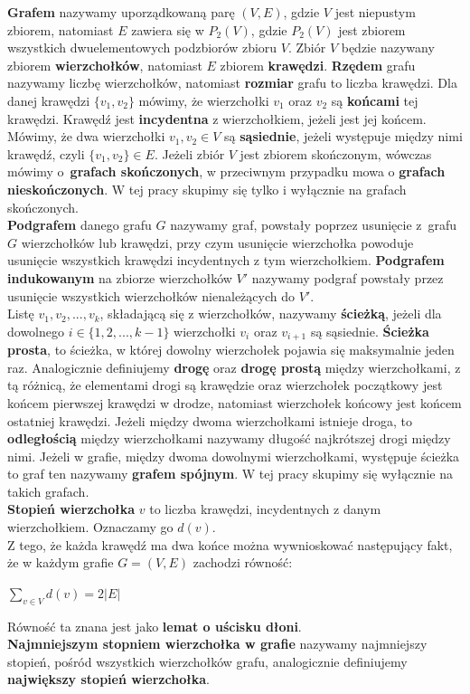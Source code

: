 \documentclass[12pt,a4paper,titlepage]{article}
\newcommand\tab[1][1cm]{\hspace*{#1}}
\begin{document}
\textbf{Grafem} nazywamy uporządkowaną parę $(V, E)$, gdzie $V$ jest niepustym zbiorem, natomiast $E$ zawiera się w  $P_2 (V)$, gdzie $P_2(V)$ jest zbiorem wszystkich dwuelementowych podzbiorów zbioru $V$. Zbiór $V$ będzie nazywany zbiorem \textbf{wierzchołków}, natomiast $E$ zbiorem \textbf{krawędzi}. \textbf{Rzędem} grafu nazywamy liczbę wierzchołków, natomiast \textbf{rozmiar} grafu to liczba krawędzi. Dla danej krawędzi $\{v_1 , v_2 \}$ mówimy, że wierzchołki $v_1$ oraz $v_2$ są \textbf{końcami} tej krawędzi. Krawędź jest \textbf{incydentna} z wierzchołkiem, jeżeli jest jej końcem. Mówimy, że dwa wierzchołki $v_1, v_2 \in V$ są \textbf{sąsiednie}, jeżeli występuje między nimi krawędź, czyli $\{v_1, v_2\} \in E$.
Jeżeli zbiór $V$ jest zbiorem skończonym, wówczas mówimy o~\textbf{grafach skończonych}, w przeciwnym przypadku mowa o \textbf{grafach nieskończonych}. W tej pracy skupimy się tylko i wyłącznie na grafach skończonych.\\
\tab[0.6cm]\textbf{Podgrafem} danego grafu $G$ nazywamy graf, powstały poprzez usunięcie z~grafu $G$ wierzchołków lub krawędzi, przy czym usunięcie wierzchołka powoduje usunięcie wszystkich krawędzi incydentnych z tym wierzchołkiem. \textbf{Podgrafem indukowanym} na zbiorze wierzchołków $V'$ nazywamy podgraf powstały przez usunięcie wszystkich wierzchołków nienależących do $V'$. \\
\tab[0.6cm]Listę $v_1, v_2, ..., v_k$, składającą się z wierzchołków, nazywamy \textbf{ścieżką}, jeżeli dla dowolnego $i \in \{1,2,..., k-1\} $ wierzchołki $v_i$ oraz $v_{i+1}$ są sąsiednie. \textbf{Ścieżka prosta}, to ścieżka, w której dowolny wierzchołek pojawia się maksymalnie jeden raz. Analogicznie definiujemy \textbf{drogę} oraz \textbf{drogę prostą} między wierzchołkami, z tą różnicą, że elementami drogi są krawędzie oraz wierzchołek początkowy jest końcem pierwszej krawędzi w drodze, natomiast wierzchołek końcowy jest końcem ostatniej krawędzi.
Jeżeli między dwoma wierzchołkami istnieje droga, to \textbf{odległością} między wierzchołkami nazywamy długość najkrótszej drogi między nimi. Jeżeli w grafie, między dwoma dowolnymi wierzchołkami, występuje ścieżka to graf ten nazywamy \textbf{grafem spójnym}. W tej pracy skupimy się wyłącznie na takich grafach.\\
\tab[0.6cm]\textbf{Stopień wierzchołka} $v$ to liczba krawędzi, incydentnych z danym wierzchołkiem. Oznaczamy go $d(v)$. \\
\tab[0.6cm]Z tego, że każda krawędź ma dwa końce można wywnioskować następujący fakt, że w każdym grafie $G=(V,E)$ zachodzi równość:
\begin{center}$\sum_{v \in V}d(v) = 2|E|$ \end{center}
Równość ta znana jest jako \textbf{lemat o uścisku dłoni}.\\
\tab[0.6cm]\textbf{Najmniejszym stopniem wierzchołka w grafie} nazywamy najmniejszy stopień, pośród wszystkich wierzchołków grafu, analogicznie definiujemy \textbf{największy stopień wierzchołka}. \\
\end{document}
